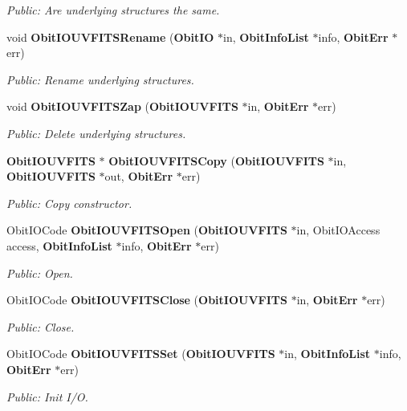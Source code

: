 \begin{CompactItemize}
\begin{CompactList}\small\item\em Public: Are underlying structures the same. \item\end{CompactList}\item 
void {\bf Obit\-IOUVFITSRename} ({\bf Obit\-IO} $\ast$in, {\bf Obit\-Info\-List} $\ast$info, {\bf Obit\-Err} $\ast$err)
\begin{CompactList}\small\item\em Public: Rename underlying structures. \item\end{CompactList}\item 
void {\bf Obit\-IOUVFITSZap} ({\bf Obit\-IOUVFITS} $\ast$in, {\bf Obit\-Err} $\ast$err)
\begin{CompactList}\small\item\em Public: Delete underlying structures. \item\end{CompactList}\item 
{\bf Obit\-IOUVFITS} $\ast$ {\bf Obit\-IOUVFITSCopy} ({\bf Obit\-IOUVFITS} $\ast$in, {\bf Obit\-IOUVFITS} $\ast$out, {\bf Obit\-Err} $\ast$err)
\begin{CompactList}\small\item\em Public: Copy constructor. \item\end{CompactList}\item 
Obit\-IOCode {\bf Obit\-IOUVFITSOpen} ({\bf Obit\-IOUVFITS} $\ast$in, Obit\-IOAccess access, {\bf Obit\-Info\-List} $\ast$info, {\bf Obit\-Err} $\ast$err)
\begin{CompactList}\small\item\em Public: Open. \item\end{CompactList}\item 
Obit\-IOCode {\bf Obit\-IOUVFITSClose} ({\bf Obit\-IOUVFITS} $\ast$in, {\bf Obit\-Err} $\ast$err)
\begin{CompactList}\small\item\em Public: Close. \item\end{CompactList}\item 
Obit\-IOCode {\bf Obit\-IOUVFITSSet} ({\bf Obit\-IOUVFITS} $\ast$in, {\bf Obit\-Info\-List} $\ast$info, {\bf Obit\-Err} $\ast$err)
\begin{CompactList}\small\item\em Public: Init I/O. \item\end{CompactList}\item 

\end{CompactItemize}
